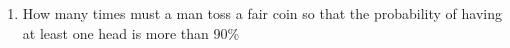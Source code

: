 \begin{enumerate}[label=\thechapter.\arabic*,ref=\thechapter.\theenumi]
\item How many times must a man toss a fair coin so that the probability of having at least one head is more than 90\%
\end{enumerate}
